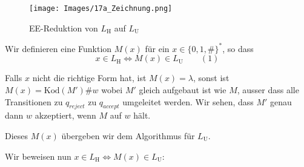                     \begin{figure}[htp]
                        \centering
                        \texttt{[image: Images/17a\_Zeichnung.png]}
                        \caption{EE-Reduktion von $L_{\text{H}}$ auf $L_{\text{U}}$}
                    \end{figure}
                    
        
                Wir definieren eine Funktion $M(x)$ für ein $x \in \{0,1,\#\}^*$, so dass
                    $$x \in L_{\text{H}} \iff M(x) \in L_{\text{U}} \qquad (1)$$
                
                    Falls $x$ nicht die richtige Form hat, ist $M(x) = \lambda$, sonst ist $M(x) = \text{Kod}(M')\#w$ wobei $M'$ gleich aufgebaut ist wie $M$, ausser dass alle Transitionen zu $q_{reject}$ zu $q_{accept}$ umgeleitet werden. Wir sehen, dass $M'$ genau dann $w$ akzeptiert, wenn $M$ auf $w$ hält. 
                    
                    Dieses $M(x)$ übergeben wir dem Algorithmus für $L_{\text{U}}$. 
            
                    
                Wir beweisen nun $x \in L_{\text{H}} \iff M(x) \in L_{\text{U}}$:
            
